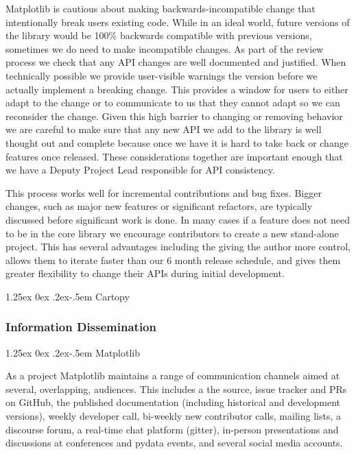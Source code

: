 \documentclass[12pt]{article}
\makeatletter
\numberwithin{page}{section}
\renewcommand{\paragraph}{%
  \@startsection{paragraph}{4}%
  {\z@}{1.25ex \@plus 0ex \@minus .2ex}{-.5em}%
  {\normalfont\normalsize\itshape\bfseries}%
}
\makeatother
\begin{document}
Matplotlib is cautious about making backwards-incompatible change that
intentionally break users existing code.  While in an ideal world, future
versions of the library would be 100\% backwards compatible with previous
versions, sometimes we do need to make incompatible changes.  As part of the
review process we check that any API changes are well documented and justified.
When technically possible we provide user-visible warnings the version before
we actually implement a breaking change.  This provides a window for users to
either adapt to the change or to communicate to us that they cannot adapt so we
can reconsider the change.  Given this high barrier to changing or removing
behavior we are careful to make sure that any new API we add to the library is
well thought out and complete because once we have it is hard to take back or
change features once released.  These considerations together are important
enough that we have a Deputy Project Lead responsible for API consistency.

This process works well for incremental contributions and bug fixes.  Bigger
changes, such as major new features or significant refactors, are typically
discussed before significant work is done.  In many cases if a feature does not
need to be in the core library we encourage contributors to create a new
stand-alone project.  This has several advantages including the giving the
author more control, allows them to iterate faster than our 6 month release
schedule, and gives them greater flexibility to change their APIs during
initial development.

\paragraph{Cartopy}


\subsubsection{Information Dissemination}

\paragraph{Matplotlib}

As a project Matplotlib maintains a range of communication channels
aimed at several, overlapping, audiences.  This includes a
the source, issue tracker and PRs on GitHub,
the published documentation (including historical and development versions),
weekly developer call,
bi-weekly new contributor calls,
mailing lists,
a discourse forum,
a real-time chat platform (gitter),
in-person presentations and discussions at conferences and pydata events,
and several social media accounts.
\end{document}
